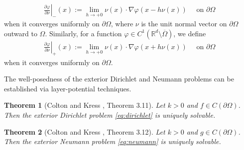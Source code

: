\documentclass{article}
\theoremstyle{plain}
\newtheorem{thm}{Theorem}[section]
\theoremstyle{definition}
\begin{document}
\begin{align*}
    \left. \frac{\partial \varphi}{\partial \nu}\right|_-(x) := \lim_{h\to +0} \nu(x)\cdot \nabla \varphi(x - h\nu(x)) \quad\text{ on }\partial\Omega
\end{align*}
when it converges uniformly on $\partial\Omega$, where $\nu$ is the unit normal vector on $\partial\Omega$ outward to $\Omega$. Similarly, for a function $\varphi\in C^1(\mathbb R^d\setminus\overline\Omega)$, we define
\begin{align*}
    \left. \frac{\partial \varphi}{\partial \nu}\right|_+(x) := \lim_{h\to +0} \nu(x)\cdot \nabla \varphi(x + h\nu(x)) \quad\text{ on }\partial\Omega
\end{align*}
when it converges uniformly on $\partial\Omega$.

The well-posedness of the exterior Dirichlet and Neumann problems can be established via layer-potential techniques. 
\begin{thm}[Colton and Kress \cite{colton1998inverse}, Theorem 3.11]\label{thm:wellposed-dirichlet}
    Let $k>0$ and $f\in C(\partial\Omega)$. Then the exterior Dirichlet problem \cref{eq:dirichlet} is uniquely solvable.
\end{thm}

\begin{thm}[Colton and Kress \cite{colton1998inverse}, Theorem 3.12]\label{thm:wellposed-neumann}
    Let $k>0$ and $g\in C(\partial\Omega)$. Then the exterior Neumann problem \cref{eq:neumann} is uniquely solvable.
\end{thm}
\end{document}
